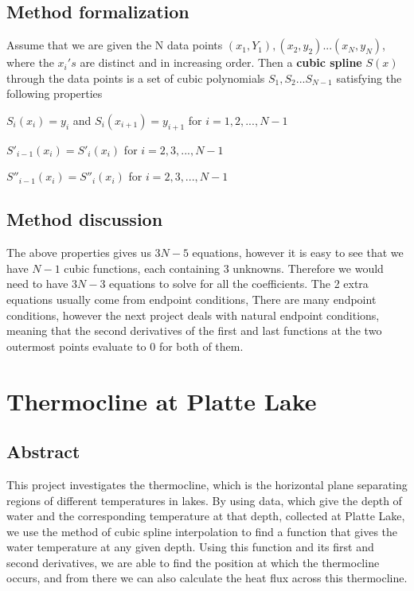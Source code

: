 \documentclass[openany]{book}
\begin{document}
    \section{Method formalization}
    Assume that we are given the N data points ${(x_1, Y_1), (x_2, y_2)...(x_N, y_N)}$, where the ${x_i's}$ are distinct and in increasing order. Then a \textbf{cubic spline} ${S(x)}$ through the data points is a set of cubic polynomials ${S_1, S_2...S_{N-1}}$ satisfying the following properties
    \begin{properties}
    	\item ${S_i(x_i) = y_i}$ and ${S_i(x_{i+1}) = y_{i+1}}$ for ${i = 1, 2,...,N-1}$
        \item ${S'_{i-1}(x_i) = S'_i(x_i)}$ for ${i = 2, 3,...,N-1}$
        \item ${S''_{i-1}(x_i) = S''_i(x_i)}$ for ${i = 2, 3,...,N-1}$
    \end{properties}
    \section{Method discussion}
    The above properties gives us ${3N-5}$ equations, however it is easy to see that we have ${N-1}$ cubic functions, each containing 3 unknowns. Therefore we would need to have ${3N-3}$ equations to solve for all the coefficients. The 2 extra equations usually come from endpoint conditions, There are many endpoint conditions, however the next project deals with natural endpoint conditions, meaning that the second derivatives of the first and last functions at the two outermost points evaluate to 0 for both of them.
    \chapter{Thermocline at Platte Lake}
	\section{Abstract}
	This project investigates the thermocline, which is the horizontal plane separating regions of different temperatures in lakes. By using data, which give the depth of water and the corresponding temperature at that depth, collected at Platte Lake, we use the method of cubic spline interpolation to find a function that gives the water temperature at any given depth. Using this function and its first and second derivatives, we are able to find the position at which the thermocline occurs, and from there we can also calculate the heat flux across this thermocline.
	
\end{document}
